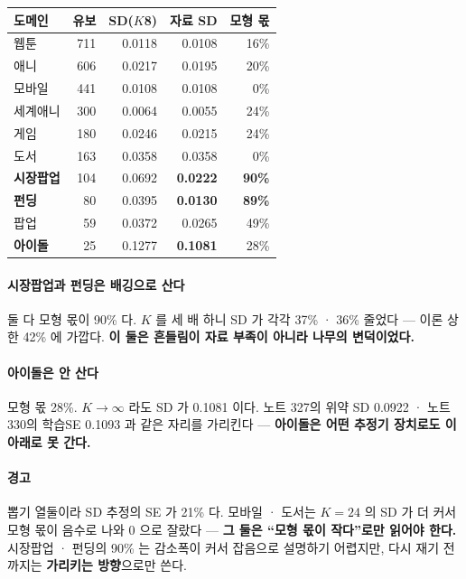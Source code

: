 \documentclass[10pt]{article}
\begin{document}
\begin{center}\footnotesize
\begin{tabular}{lrrrr}
\hline
도메인 & 유보 & SD($K$8) & 자료 SD & 모형 몫 \\
\hline
웹툰 & 711 & 0.0118 & 0.0108 & 16\% \\
애니 & 606 & 0.0217 & 0.0195 & 20\% \\
모바일 & 441 & 0.0108 & 0.0108 & 0\% \\
세계애니 & 300 & 0.0064 & 0.0055 & 24\% \\
게임 & 180 & 0.0246 & 0.0215 & 24\% \\
도서 & 163 & 0.0358 & 0.0358 & 0\% \\
\textbf{시장팝업} & 104 & 0.0692 & \textbf{0.0222} & \textbf{90\%} \\
\textbf{펀딩} & 80 & 0.0395 & \textbf{0.0130} & \textbf{89\%} \\
팝업 & 59 & 0.0372 & 0.0265 & 49\% \\
\textbf{아이돌} & 25 & 0.1277 & \textbf{0.1081} & 28\% \\
\hline
\end{tabular}
\end{center}

\paragraph{시장팝업과 펀딩은 배깅으로 산다} 둘 다 모형 몫이 90\% 다.
$K$ 를 세 배 하니 SD 가 각각 37\% · 36\% 줄었다 --- 이론 상한 42\% 에
가깝다. \textbf{이 둘은 흔들림이 자료 부족이 아니라 나무의 변덕이었다.}

\paragraph{아이돌은 안 산다} 모형 몫 28\%. $K \to \infty$ 라도 SD 가
0.1081 이다. 노트 327의 위약 SD 0.0922 · 노트 330의 학습SE 0.1093 과
같은 자리를 가리킨다 --- \textbf{아이돌은 어떤 추정기 장치로도 이 아래로
못 간다.}

\paragraph{경고} 뽑기 열둘이라 SD 추정의 SE 가 21\% 다. 모바일 · 도서는
$K{=}24$ 의 SD 가 더 커서 모형 몫이 음수로 나와 0 으로 잘랐다 ---
\textbf{그 둘은 ``모형 몫이 작다''로만 읽어야 한다.} 시장팝업 · 펀딩의
90\% 는 감소폭이 커서 잡음으로 설명하기 어렵지만, 다시 재기 전까지는
\textbf{가리키는 방향}으로만 쓴다.
\end{document}
